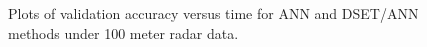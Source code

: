 \documentclass[12pt]{uthesis-v12}  %
\begin{document}
\begin{figure}
	\hfill	
{}
						
\caption{Plots of validation accuracy versus time for ANN and DSET/ANN methods under 100 meter radar data.}
	\label{100-multis}
	\end{figure}
	
\end{document}
